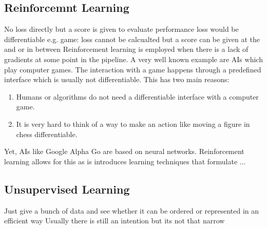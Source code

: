 \subsection{Reinforcemnt Learning}
No loss directly but a score is given to evaluate performance
loss would be differentiable
e.g. game: loss cannot be calcualted but a score can be given at the and or in between
Reinforcement learning is employed when there is a lack of gradients at some point in the pipeline.
A very well known example are AIs which play computer games.
The interaction with a game happens through a predefined interface which is usually not differentiable.
This has two main reasons:
\begin{enumerate}
    \item Humans or algorithms do not need a differentiable interface with a computer game.
    \item It is very hard to think of a way to make an action like moving a figure in chess differentiable.
\end{enumerate}

Yet, AIs like Google Alpha Go are based on neural networks.
Reinforcement learning allows for this as is introduces learning techniques that formulate ...

\subsection{Unsupervised Learning}
Just give a bunch of data and see whether it can be ordered or represented in an efficient way
Usually there is still an intention but its not that narrow
